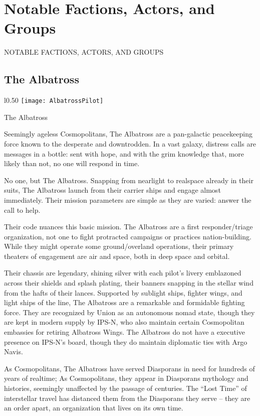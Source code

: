 \section{Notable Factions, Actors, and Groups}


                                                  NOTABLE FACTIONS,
                                                  ACTORS, AND
                                                  GROUPS
\subsection{The Albatross}
\begin{wrapfigure}{l}{0.50\textwidth}
   \centering
   \texttt{[image: AlbatrossPilot]}
 \end{wrapfigure}

The Albatross

Seemingly ageless Cosmopolitans, The Albatross are a pan-galactic peacekeeping
force known to the desperate and downtrodden. In a vast galaxy, distress calls
are messages in a bottle: sent with hope, and with the grim knowledge that, more
likely than not, no one will respond in time.

No one, but The Albatross. Snapping from nearlight to realspace already in their
suits, The Albatross launch from their carrier ships and engage almost
immediately. Their mission parameters are simple as they are varied: answer the
call to help.

Their code nuances this basic mission. The Albatross are a first
responder/triage organization, not one to fight protracted campaigns or
practices nation-building. While they might operate some ground/overland
operations, their primary theaters of engagement are air and space, both in deep
space and orbital.

Their chassis are legendary, shining silver with each pilot’s livery emblazoned
across their shields and splash plating, their banners snapping in the stellar
wind from the hafts of their lances. Supported by sublight ships, fighter wings,
and light ships of the line, The Albatross are a remarkable and formidable
fighting force. They are recognized by Union as an autonomous nomad state,
though they are kept in modern supply by IPS-N, who also maintain certain
Cosmopolitan embassies for retiring Albatross Wings. The Albatross do not have a
executive presence on IPS-N’s board, though they do maintain diplomatic ties
with Argo Navis.

As Cosmopolitans, The Albatross have served Diasporans in need for hundreds of
years of realtime; As Cosmopolitans, they appear in Diasporans mythology and
histories, seemingly unaffected by the passage of centuries. The “Lost Time” of
interstellar travel has distanced them from the Diasporans they serve -- they
are an order apart, an organization that lives on its own time.

